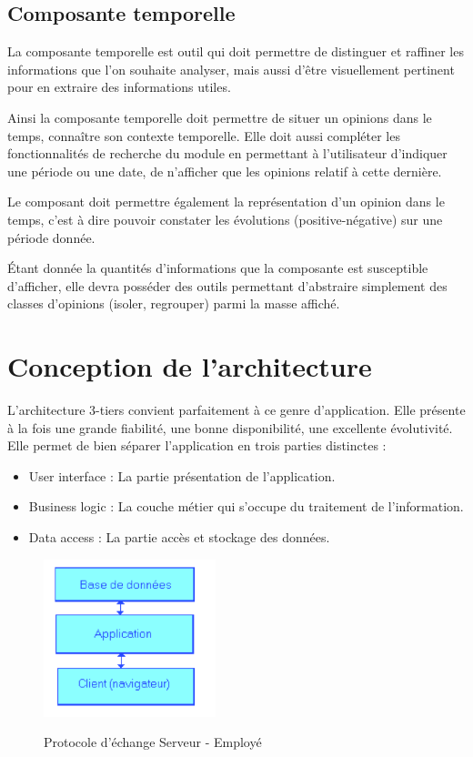 \subsection{Composante temporelle}

La composante temporelle est outil qui doit permettre de distinguer et raffiner les informations que l'on souhaite analyser, mais aussi d'être visuellement pertinent pour en extraire des informations utiles.

Ainsi la composante temporelle doit permettre de situer un opinions dans le temps, connaître son contexte temporelle.
Elle doit aussi compléter les fonctionnalités de recherche du module en permettant à l'utilisateur d'indiquer une période ou une date, de n'afficher que les opinions relatif à cette dernière.

Le composant doit permettre également la représentation d'un opinion dans le temps, c'est à dire pouvoir constater les évolutions (positive-négative) sur une période donnée.

Étant donnée la quantités d'informations que la composante est susceptible d'afficher, elle devra posséder des outils permettant d'abstraire simplement des classes d'opinions (isoler, regrouper) parmi la masse affiché.

\section{Conception de l’architecture} \label{Architecture}

L'architecture 3-tiers convient parfaitement à ce genre d'application. Elle présente à la fois une grande fiabilité, une bonne disponibilité, une excellente évolutivité. \\

Elle permet de bien séparer l'application en trois parties distinctes :

\begin{itemize}
\item User interface : La partie présentation de l'application.
\item Business logic : La couche métier qui s'occupe du traitement de l'information. 
\item Data access : La partie accès et stockage des données.
\end{itemize}


\begin{center}
\begin{figure}[H] \centering
\includegraphics[width=5cm]{archi1.png}\\
\caption{\label{appli} Protocole d'échange Serveur - Employé}
\end{figure}
\end{center}

